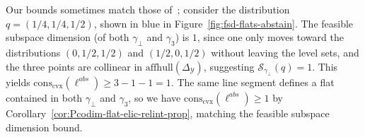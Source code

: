 \documentclass[anon,12pt]{colt2021} %
\newcommand{\simplex}{\Delta_\Y}
\newcommand{\conscvx}{\mathrm{cons}_\mathrm{cvx}}
\newcommand{\affhull}{\mathrm{affhull}}
\newcommand{\Sc}{\mathcal{S}}  %
\newcommand{\Y}{\mathcal{Y}}
\begin{document}
Our bounds sometimes match those of~\citep{ramaswamy2016convex}; consider the distribution $q = (1/4, 1/4, 1/2)$, shown in blue in Figure~\ref{fig:fsd-flats-abstain}.
The feasible subspace dimension (of both $\gamma_\bot$ and $\gamma_3$) is $1$, since one only moves toward the distributions $(0,1/2, 1/2)$ and $(1/2, 0, 1/2)$ without leaving the level sets, and the three points are collinear in $\affhull(\simplex)$, suggesting $\Sc_{\gamma_\bot}(q) = 1$.  
This yields $\conscvx(\ell^{abs}) \geq 3 - 1- 1 = 1$.
The same line segment defines a flat contained in both $\gamma_\bot$ and $\gamma_3$, so we have $\conscvx(\ell^{abs}) \geq 1$ by Corollary~\ref{cor:Pcodim-flat-elic-relint-prop}, matching the feasible subspace dimension bound.


\end{document}
